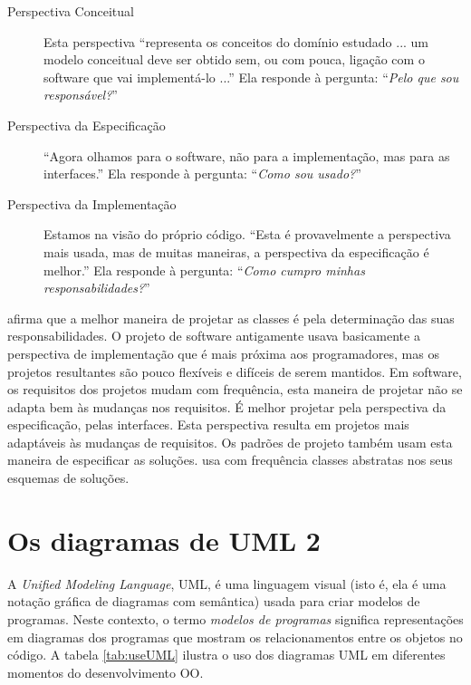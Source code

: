 \begin{description}
\item[Perspectiva Conceitual] Esta perspectiva ``representa os conceitos do domínio estudado ... um modelo conceitual deve ser obtido sem, ou com pouca, ligação com o software que vai implementá-lo ...'' Ela responde à pergunta: ``\emph{Pelo que sou responsável?}''

\item[Perspectiva da Especificação] ``Agora olhamos para o software, não para a implementação, mas para as interfaces.'' Ela responde à pergunta: ``\emph{Como sou usado?}''

\item[Perspectiva da Implementação] Estamos na visão do próprio código. ``Esta é provavelmente a perspectiva mais usada, mas de muitas maneiras, a perspectiva da especificação é melhor.'' Ela responde à pergunta: ``\emph{Como cumpro minhas responsabilidades?}''
\end{description}

\cite{DP:explained} afirma que a melhor maneira de projetar as classes é pela determinação das suas responsabilidades. O projeto de software antigamente usava basicamente a perspectiva de implementação que é mais próxima aos programadores, mas os projetos resultantes são pouco flexíveis e difíceis de serem mantidos. Em software, os requisitos dos projetos mudam com frequência, esta maneira de projetar não se adapta bem às mudanças nos requisitos. É melhor projetar pela perspectiva da especificação, pelas interfaces. Esta perspectiva resulta em projetos mais adaptáveis às mudanças de requisitos. Os padrões de projeto também usam esta maneira de especificar as soluções. \cite{design:patterns} usa com frequência classes abstratas nos seus esquemas de soluções.

\section{Os diagramas de UML 2}

A \textit{Unified Modeling Language}, UML, é uma linguagem visual (isto é, ela é uma notação gráfica de diagramas com semântica) usada para criar modelos de programas. Neste contexto, o termo \textit{modelos de programas} significa representações em diagramas dos programas que mostram os relacionamentos entre os objetos no código. A tabela \ref{tab:useUML} ilustra o uso dos diagramas UML em diferentes momentos do desenvolvimento OO.

